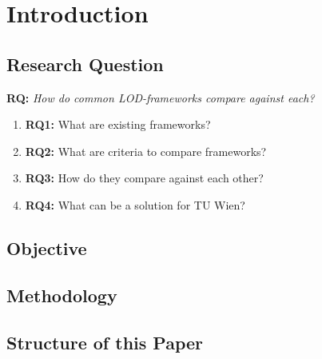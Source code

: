 \chapter{Introduction}

\section{Research Question}
\textbf{RQ:} \textit{How do common LOD-frameworks compare against each?}
\begin{enumerate}
\item \textbf{RQ1:} What are existing frameworks?
\item \textbf{RQ2:} What are criteria to compare frameworks?
\item \textbf{RQ3:} How do they compare against each other?
\item \textbf{RQ4:} What can be a solution for TU Wien?
\end{enumerate}

\section{Objective}
\section{Methodology}
\section{Structure of this Paper}